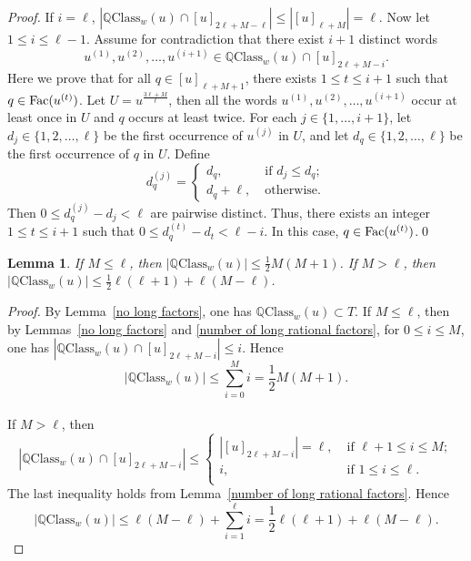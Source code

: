 \documentclass[runningheads,envcountsame,a4paper]{llncs}
\newtheorem{lem}[thm]{Lemma}
\newcommand{\fac}{\hbox{\rm Fac}}
\newcommand{\qcl}{\mathbb{Q}\mathrm{Class}}
\begin{document}
\begin{proof}

If $i=\ell$, $|\qcl_w(u) \cap [u]_{2\ell+M-\ell}|\le |[u]_{\ell+M}| =\ell$. Now let $1\le i\le \ell-1$. Assume for contradiction that there exist $i+1$ distinct words
\[
u^{(1)},u^{(2)},\dots,u^{(i+1)} \in \qcl_w(u)\cap [u]_{2\ell+M-i}.
\]
Here we prove that for all $q\in [u]_{\ell+M+1}$, there exists $1 \leq t \leq i+1$ such that $q \in \fac(u^{(t)})$. Let $U=u^{\frac{3\ell+M}{\ell}}$, then all the words $u^{(1)},u^{(2)},\dots,u^{(i+1)}$ occur at least once in $U$ and $q$ occurs at least twice. For each $j\in\{1,\dots,i+1\}$, let $d_j\in\{1,2,\dots,\ell\}$ be the first occurrence of $u^{(j)}$ in $U$, and let $d_q\in\{1,2,\dots,\ell\}$ be the first occurrence of $q$ in $U$.
Define $$d_q^{(j)}=\begin{cases}
    d_q,&\; \text{if $d_j \leq d_q$};\\
    d_q+\ell,&\; \text{otherwise}.
\end{cases}$$
Then $0\le d_q^{(j)}-d_j <\ell$ are pairwise distinct. Thus, there exists an integer $1 \leq t\leq i+1$ such that $0\le d_q^{(t)}-d_t <\ell-i$. In this case, $q \in \fac(u^{(t)})$.\qed

\end{proof}

\begin{lem}\label{estimation of RP for one class}
If $M\le\ell$, then $|\qcl_w(u)|\le \frac12 M(M+1)$. If $M>\ell$, then $|\qcl_w(u)|\le \frac12 \ell(\ell+1)+\ell(M-\ell)$.
\end{lem}

\begin{proof}
By Lemma~\ref{no long factors}, one has $\qcl_w(u)\subset T$. If $M\le\ell$, then by Lemmas~\ref{no long factors} and \ref{number of long rational factors}, for $0\le i\le M$, one has $|\qcl_w(u) \cap [u]_{2\ell+M-i}|\le i$. Hence 
$$|\qcl_w(u)|\le \sum\limits_{i=0}^M i=\frac12 M(M+1).$$\\
If $M>\ell$, then 
$$|\qcl_w(u) \cap [u]_{2\ell+M-i}| \leq 
\begin{cases}
|[u]_{2\ell+M-i}|=\ell,& \; \text{if $\ell+1\le i\le M$};\\
i,& \; \text{if $1\le i\le \ell$}.\\
\end{cases}$$ 
The last inequality holds from Lemma~\ref{number of long rational factors}. Hence $$|\qcl_w(u)|\le \ell(M-\ell)+\sum\limits_{i=1}^{\ell} i=\frac12 \ell(\ell+1)+\ell(M-\ell).$$


\end{proof}
\end{document}

